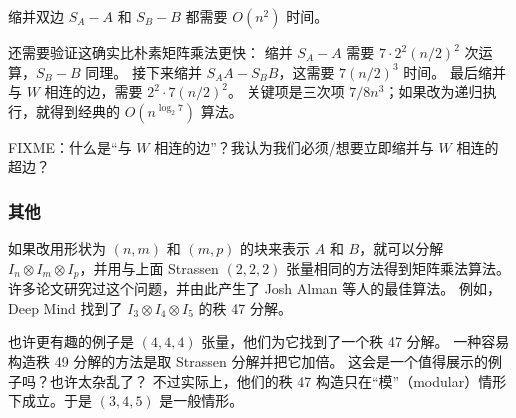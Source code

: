 \newpage

缩并双边 $S_A - A$ 和 $S_B - B$ 都需要 $O(n^2)$ 时间。

还需要验证这确实比朴素矩阵乘法更快：
缩并 $S_A - A$ 需要 $7\cdot 2^2 (n/2)^2$ 次运算，$S_B - B$ 同理。
接下来缩并 $S_AA - S_BB$，这需要 $7(n/2)^3$ 时间。
最后缩并与 $W$ 相连的边，需要 $2^2 \cdot 7 (n/2)^2$。
关键项是三次项 $7/8 n^3$；如果改为递归执行，就得到经典的 $O(n^{\log_2 7})$ 算法。

FIXME：什么是“与 $W$ 相连的边”？我认为我们必须/想要立即缩并与 $W$ 相连的超边？

\subsubsection{其他}

如果改用形状为 $(n,m)$ 和 $(m,p)$ 的块来表示 $A$ 和 $B$，就可以分解 $I_n\otimes I_m\otimes I_p$，并用与上面 Strassen $(2,2,2)$ 张量相同的方法得到矩阵乘法算法。
许多论文研究过这个问题，并由此产生了 Josh Alman 等人的最佳算法。
例如，Deep Mind 找到了 $I_3\otimes I_4\otimes I_5$ 的秩 47 分解。

也许更有趣的例子是 $(4,4,4)$ 张量，他们为它找到了一个秩 47 分解。
一种容易构造秩 49 分解的方法是取 Strassen 分解并把它加倍。
这会是一个值得展示的例子吗？也许太杂乱了？
不过实际上，他们的秩 47 构造只在“模”（modular）情形下成立。于是 $(3,4,5)$ 是一般情形。

